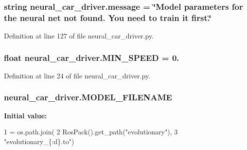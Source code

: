 \subsubsection[{\texorpdfstring{message}{message}}]{\setlength{\rightskip}{0pt plus 5cm}string neural\+\_\+car\+\_\+driver.\+message = \char`\"{}Model parameters for the neural net not found. You need to train it first.\char`\"{}}\hypertarget{namespaceneural__car__driver_a65829420a3ca6888c41c04e36ad0c4fb}{}\label{namespaceneural__car__driver_a65829420a3ca6888c41c04e36ad0c4fb}


Definition at line 127 of file neural\+\_\+car\+\_\+driver.\+py.

\subsubsection[{\texorpdfstring{M\+I\+N\+\_\+\+S\+P\+E\+ED}{MIN_SPEED}}]{\setlength{\rightskip}{0pt plus 5cm}float neural\+\_\+car\+\_\+driver.\+M\+I\+N\+\_\+\+S\+P\+E\+ED = 0.}\hypertarget{namespaceneural__car__driver_a5292cc13090a4c357e023f5732a8a18a}{}\label{namespaceneural__car__driver_a5292cc13090a4c357e023f5732a8a18a}


Definition at line 24 of file neural\+\_\+car\+\_\+driver.\+py.

\subsubsection[{\texorpdfstring{M\+O\+D\+E\+L\+\_\+\+F\+I\+L\+E\+N\+A\+ME}{MODEL_FILENAME}}]{\setlength{\rightskip}{0pt plus 5cm}neural\+\_\+car\+\_\+driver.\+M\+O\+D\+E\+L\+\_\+\+F\+I\+L\+E\+N\+A\+ME}\hypertarget{namespaceneural__car__driver_a067bf25e6557471566d69b477b79ade5}{}\label{namespaceneural__car__driver_a067bf25e6557471566d69b477b79ade5}
{\bfseries Initial value\+:}
\begin{DoxyCode}
1 = os.path.join(
2     RosPack().get\_path(\textcolor{stringliteral}{"evolutionary"}),
3     \textcolor{stringliteral}{"evolutionary\_\{:d\}.to"})
\end{DoxyCode}


